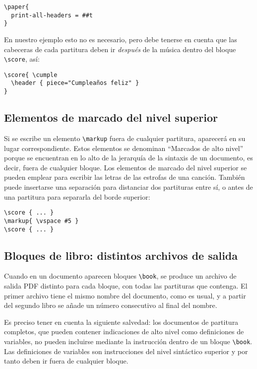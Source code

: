 \begin{verbatim}
\paper{
  print-all-headers = ##t
}
\end{verbatim}

En nuestro ejemplo esto no es necesario, pero debe tenerse en cuenta
que las cabeceras de cada partitura deben ir \emph{después} de la
música dentro del bloque \verb+\score+, así:

\begin{verbatim}
\score{ \cumple
  \header { piece="Cumpleaños feliz" }
}
\end{verbatim}


\subsection{Elementos de marcado del nivel superior}

Si se escribe un elemento \verb+\markup+ fuera de cualquier partitura,
aparecerá en su lugar correspondiente.  Estos elementos se denominan
``Marcados de alto nivel'' porque se encuentran en lo alto de la
jerarquía de la sintaxis de un documento, es decir, fuera de cualquier
bloque.  Los elementos de marcado del nivel superior se pueden emplear
para escribir las letras de las estrofas de una canción.  También
puede insertarse una separación para distanciar dos partituras entre
sí, o antes de una partitura para separarla del borde superior:

\begin{verbatim}
\score { ... }
\markup{ \vspace #5 }
\score { ... }
\end{verbatim}

\subsection{Bloques de libro: distintos archivos de salida}

Cuando en un documento aparecen bloques \verb+\book+, se produce un
archivo de salida PDF distinto para cada bloque, con todas las
partituras que contenga.  El primer archivo tiene el mismo nombre del
documento, como es usual, y a partir del segundo libro se añade un
número consecutivo al final del nombre.

Es preciso tener en cuenta la siguiente salvedad: los documentos de
partitura completos, que pueden contener indicaciones de alto nivel
como definiciones de variables, no pueden incluirse mediante la
instrucción \verb++ dentro de un bloque \verb+\book+.  Las
definiciones de variables son instrucciones del nivel sintáctico
superior y por tanto deben ir fuera de cualquier bloque.

